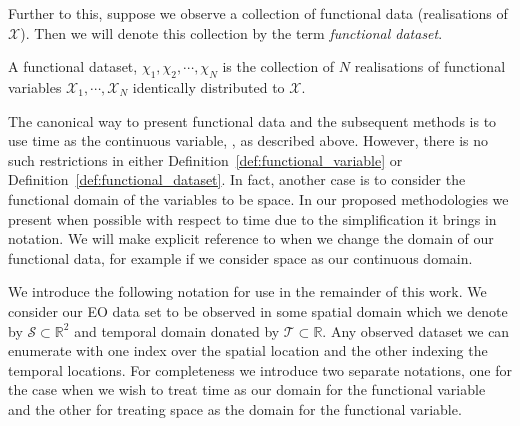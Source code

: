 Further to this, suppose we observe a collection of functional data (realisations of $\mathcal{X}$).
Then we will denote this collection by the term \textit{functional dataset}.

\begin{definition}
	A functional dataset, $\chi_1, \chi_2, \cdots, \chi_N$ is the collection of $N$ realisations of functional variables $\mathcal{X}_1, \cdots, \mathcal{X}_N$ identically distributed to $\mathcal{X}$.
	\label{def:functional_dataset}
\end{definition}

The canonical way to present functional data and the subsequent methods is to use time as the continuous variable, \cite{ramsay_functional_2010, ferraty_nonparametric_2006, shi_gaussian_2011}, as described above.
However, there is no such restrictions in either Definition~\ref{def:functional_variable} or Definition~\ref{def:functional_dataset}. 
In fact, another case is to consider the functional domain of the variables to be space.
In our proposed methodologies we present when possible with respect to time due to the simplification it brings in notation.
We will make explicit reference to when we change the domain of our functional data, for example if we consider space as our continuous domain. 

We introduce the following notation for use in the remainder of this work.
We consider our EO data set to be observed in some spatial domain which we denote by $\mathcal{S} \subset \mathbb{R}^2$ and temporal domain donated by $\mathcal{T} \subset \mathbb{R}$.
Any observed dataset we can enumerate with one index over the spatial location and the other indexing the temporal locations.
For completeness we introduce two separate notations, one for the case when we wish to treat time as our domain for the functional variable and the other for treating space as the domain for the functional variable.

